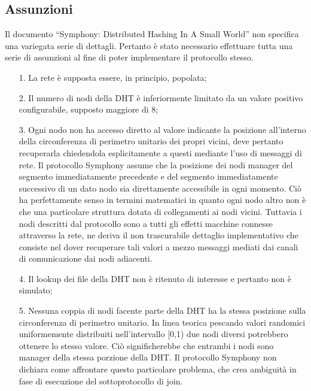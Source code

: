 \documentclass[	
	DIV=calc,
	paper=a4,
	fontsize=11pt,
	onecolumn
]{scrartcl} %
\begin{document}
	\subsection{Assunzioni}
	Il documento ``Symphony: Distributed Hashing In A Small World'' non specifica una variegata serie di dettagli. Pertanto è stato necessario effettuare tutta una serie di assunzioni al fine di poter implementare il protocollo stesso.
	\begin{itemize}
	\item[1.] La rete è supposta essere, in principio, popolata;
	\item[2.] Il numero di nodi della DHT è inferiormente limitato da un valore positivo configurabile, supposto maggiore di 8;
	\item[3.] Ogni nodo non ha accesso diretto al valore indicante la posizione all'interno della circonferenza di perimetro unitario dei propri vicini, deve pertanto recuperarla chiedendola esplicitamente a questi mediante l'uso di messaggi di rete. Il protocollo Symphony assume che la posizione dei nodi manager del segmento immediatamente precedente e del segmento immediatamente successivo di un dato nodo sia direttamente accessibile in ogni momento. Ciò ha perfettamente senso in termini matematici in quanto ogni nodo altro non è che una particolare struttura dotata di collegamenti ai nodi vicini. Tuttavia i nodi descritti dal protocollo sono a tutti gli effetti macchine connesse attraverso la rete, ne deriva il non trascurabile dettaglio implementativo che consiste nel dover recuperare tali valori a mezzo messaggi mediati dai canali di comunicazione dai nodi adiacenti. 
	\item[4.] Il lookup dei file della DHT non è ritenuto di interesse e pertanto non è simulato;
	\item[5.] Nessuna coppia di nodi facente parte della DHT ha la stessa posizione sulla circonferenza di perimetro unitario. In linea teorica pescando valori randomici uniformemente distribuiti nell'intervallo [0,1) due nodi diversi potrebbero ottenere lo stesso valore. Ciò significherebbe che entrambi i nodi sono manager della stessa porzione della DHT. Il protocollo Symphony non dichiara come affrontare questo particolare problema, che crea ambiguità in fase di esecuzione del sottoprotocollo di join.
	\end{itemize}
	
\end{document}
